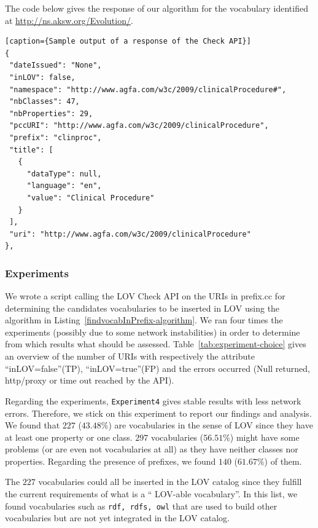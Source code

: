 \begin{description}
The code below gives the response of our algorithm for the vocabulary identified at \url{http://ns.aksw.org/Evolution/}.
\begin{verbatim}[caption={Sample output of a response of the Check API}]
{
 "dateIssued": "None",
 "inLOV": false,
 "namespace": "http://www.agfa.com/w3c/2009/clinicalProcedure#",
 "nbClasses": 47,
 "nbProperties": 29,
 "pccURI": "http://www.agfa.com/w3c/2009/clinicalProcedure",
 "prefix": "clinproc",
 "title": [
   {
     "dataType": null,
     "language": "en",
     "value": "Clinical Procedure"
   }
 ],
 "uri": "http://www.agfa.com/w3c/2009/clinicalProcedure"
},
\end{verbatim}

\subsubsection{Experiments} \label{experiments}
We wrote a script calling the LOV Check API on the URIs in prefix.cc for determining the candidates vocabularies to be inserted in LOV using the algorithm in Listing~\ref{findvocabInPrefix-algorithm}. We ran four times the experiments (possibly due to some network instabilities) in order to determine from which results what should be assessed. Table~\ref{tab:experiment-choice} gives an overview of the number of URIs with respectively the attribute ``inLOV=false''(TP), ``inLOV=true''(FP) and the errors occurred (Null returned, http/proxy or time out reached by the API).

Regarding the experiments, \texttt{Experiment4} gives stable results with less network errors. Therefore, we stick on this experiment to report our findings and analysis. We found that $227$ ($43.48$\%) are vocabularies in the sense of LOV since they have at least one property or one class. $297$ vocabularies ($56.51$\%) might have some problems (or are even not vocabularies at all) as they have neither classes nor properties. Regarding the presence of prefixes, we found $140$ ($61.67$\%) of them.
\begin{table}[!htbp]
\end{table}
The $227$ vocabularies could all be inserted in the LOV catalog since they fulfill the current requirements of what is a `` LOV-able vocabulary''. In this list, we found vocabularies such as \texttt{rdf, rdfs, owl} that are used to build other vocabularies but are not yet integrated in the LOV catalog.


\end{description}
